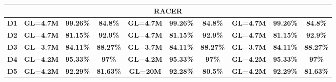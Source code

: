 \begin{table}
{\begin{tabular}{ |c|c|c|c|c|c|c|c|c|c| }
  \hline
  \multicolumn{10}{|c|}{\textbf{RACER}}\\
  \hline
                         \textbf{D1} & \textbf{GL=4.7M} & \textbf{99.26\%} & \textbf{84.8\%} & \textbf{GL=4.7M} & \textbf{99.26\%} & \textbf{84.8\%} & \textbf{GL=4.7M} & \textbf{99.26\%} & \textbf{84.8\%}\\ 
 \hline
     					  \textbf{D2} & \textbf{GL=4.7M} & \textbf{81.15\%} & \textbf{92.9\%} & \textbf{GL=4.7M} & \textbf{81.15\%} & \textbf{92.9\%} & \textbf{GL=4.7M} & \textbf{81.15\%} & \textbf{92.9\%}
\\ \hline
     				 \textbf{D3}  & \textbf{GL=3.7M} & \textbf{84.11\%} & \textbf{88.27\%}  & \textbf{GL=3.7M} & \textbf{84.11\%} & \textbf{88.27\%} & \textbf{GL=3.7M} & \textbf{84.11\%} & \textbf{88.27\%}
\\ \hline                        
                         \textbf{D4} & \textbf{GL=4.2M} & \textbf{95.33\%} & \textbf{97\%} & \textbf{GL=4.2M} & \textbf{95.33\%} & \textbf{97\%} & \textbf{GL=4.2M} & \textbf{95.33\%} & \textbf{97\%}
\\ \hline                           
                         \textbf{D5} & \textbf{GL=4.2M} & \textbf{92.29\%} & \textbf{81.63\%} & \textbf{GL=20M} & \textbf{92.28\%} &  \textbf{80.5\%} & \textbf{GL=4.2M} & \textbf{92.29\%} & \textbf{81.63\%}
  \\ \hline 
  \end{tabular}}
\label{tb1:Lighter-Blue-Racer-Perplexity-vs-Alignment}
\end{table}
\vspace{-8pt}
\begin{comment}


\begin{table}[H]
\centering
\begin{tabular}{ |c|c|c| }
\hline
 Dataset & \makecell{Correlation \\ (N-Gram)} & \makecell{Correlation \\ (RNN)}\\ 
 \hline
 D1 &  -0.977 & -0.938 \\ 
 D2 &  -0.981 & -0.969 \\ 
 D3 &  -0.982 & -0.968 \\   
 D4 &  -0.946 & -0.930 \\
 D5 &  -0.970 & -0.962 \\
\hline
\end{tabular}
\caption {Correlation value between Perplexity of our proposed approaches and Overall Alignment Rate for our five data sets. This demonstrates the strong relationship between the Perplexity Metric and the Overall Alignment Rate.}
\label{tbl:Correlation_N_Gram}
\end{table}
\end{comment}
